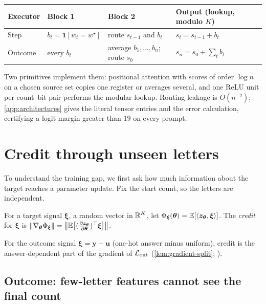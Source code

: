 \begin{center}
\small
\begin{tabular}{@{}llll@{}}
\toprule
Executor & Block 1 & Block 2 & Output (lookup, modulo $K$)\\
\midrule
Step & $b_t=\mathbf 1[w_t=w^\star]$ & route $s_{t-1}$ and $b_t$ & $s_t=s_{t-1}+b_t$\\
Outcome & every $b_t$ & average $b_1,\ldots,b_n$; route $s_0$ & $s_n=s_0+\sum_tb_t$\\
\bottomrule
\end{tabular}
\end{center}
Two primitives implement them: positional attention with scores of order $\log n$ on a chosen source set copies one register or
averages several, and one ReLU unit per count--bit pair performs the modular lookup. Routing leakage is $O(n^{-2})$;
\cref{app:architectures} gives the literal tensor entries and the error calculation, certifying a logit margin greater than $19$ on every
prompt.

\section{Credit through unseen letters}
\label{sec:credit}

To understand the training gap, we first ask how much information about the target reaches a parameter update.
Fix the start count, so the letters are independent.

\begin{definition}[Credit]
\label{def:credit}
For a target signal $\bm\xi$, a random vector in $\mathbb R^K$, let $\Phi_{\bm\xi}(\bm\theta)=\mathbb E[\langle\bm z_{\bm\theta},\bm\xi\rangle]$. The
\emph{credit} for $\bm\xi$ is $\|\nabla_{\bm\theta}\cred_{\bm\xi}\|=\bigl\|\E\bigl[(\Jz)^\top\bm\xi\bigr]\bigr\|$.
\end{definition}

For the outcome signal $\bm\xi=\bm y-\bm u$ (one-hot answer minus uniform), credit is the answer-dependent part of the gradient of
$\mathcal L_{\mathrm{out}}$ (\cref{lem:gradient-split}; \citealp{shalevshwartz2017failures,abbe2025parities}).

\subsection{Outcome: few-letter features cannot see the final count}
